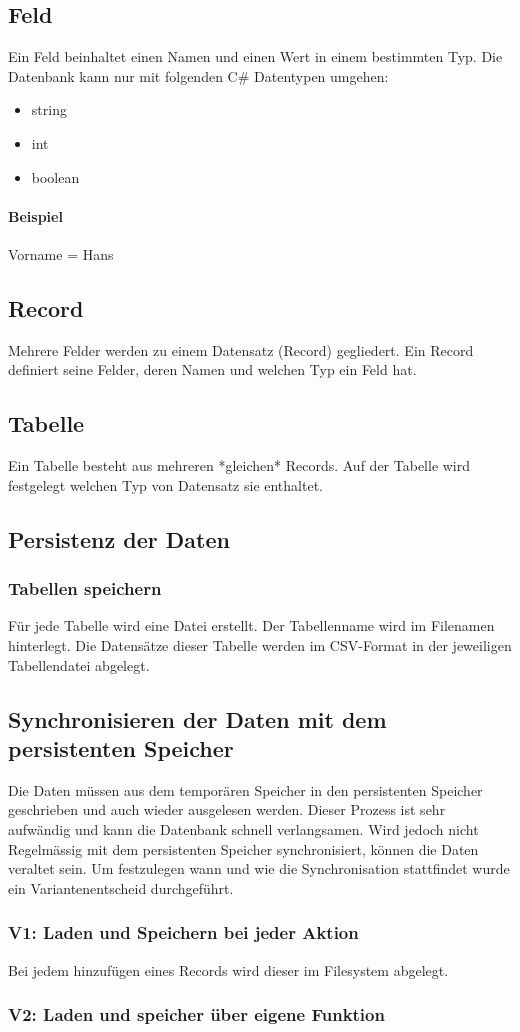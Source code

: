 \documentclass{article}
\begin{document}
\subsection{Feld}
Ein Feld beinhaltet einen Namen und einen Wert in einem bestimmten Typ. 
Die Datenbank kann nur mit folgenden C\# Datentypen umgehen: 
\begin{itemize}
	\item string
	\item int
	\item boolean
\end{itemize}
\paragraph{Beispiel}
Vorname = Hans
\subsection{Record}
Mehrere Felder werden zu einem Datensatz (Record) gegliedert. Ein Record definiert seine Felder, deren Namen und welchen Typ ein Feld hat.
\subsection{Tabelle}
Ein Tabelle besteht aus mehreren *gleichen* Records. Auf der Tabelle wird festgelegt welchen Typ von Datensatz sie enthaltet. 
 
 \subsection{Persistenz der Daten}
 \subsubsection{Tabellen speichern}
 Für jede Tabelle wird eine Datei erstellt. Der Tabellenname wird im Filenamen hinterlegt. 
 Die Datensätze dieser Tabelle werden im CSV-Format in der jeweiligen Tabellendatei abgelegt.
 \subsection{Synchronisieren der Daten mit dem persistenten Speicher}
 Die Daten müssen aus dem temporären Speicher in den persistenten Speicher geschrieben und auch wieder ausgelesen werden. Dieser Prozess ist sehr aufwändig und kann die Datenbank schnell verlangsamen. Wird jedoch nicht Regelmässig mit dem persistenten Speicher synchronisiert, können die Daten veraltet sein. Um festzulegen wann und wie die Synchronisation stattfindet wurde ein Variantenentscheid durchgeführt. 
 \subsubsection{V1: Laden und Speichern bei jeder Aktion}
 Bei jedem hinzufügen eines Records wird dieser im Filesystem abgelegt.
 
 \subsubsection{V2: Laden und speicher über eigene Funktion}
\end{document}
